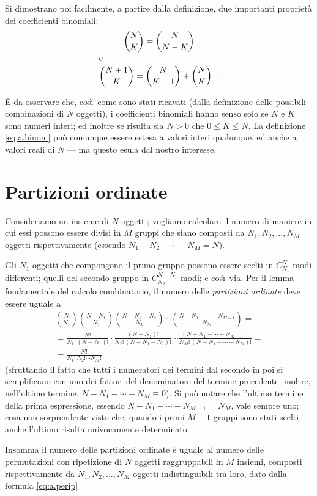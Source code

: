 %
Si dimostrano poi facilmente, a partire dalla definizione,
due importanti propriet\`a dei coefficienti binomiali:
\begin{gather*}
  \binom{N}{K} = \binom{N}{N-K} \\
  \intertext{e}
  \binom{N+1}{K} = \binom{N}{K-1} + \binom{N}{K} \;\; .
\end{gather*}

\`E da osservare che, cos\`\i\ come sono stati ricavati
(dalla definizione delle possibili combinazioni di $N$
oggetti), i coefficienti binomiali hanno senso solo se $N$ e
$K$ sono numeri interi; ed inoltre se risulta sia $N > 0$
che $0 \le K \le N$.  La definizione \eqref{eq:a.binom}
pu\`o comunque essere estesa a valori interi qualunque, ed
anche a valori reali di $N$ --- ma questo esula dal nostro
interesse.%
%

\section{Partizioni ordinate}%
%
\label{ch:a.parord}
Consideriamo un insieme di $N$ oggetti; vogliamo calcolare
il numero di maniere in cui essi possono essere divisi in
$M$ gruppi che siano composti da $N_1, N_2,\ldots,N_M$
oggetti rispettivamente (essendo $N_1 + N_2 + \cdots + N_M =
N$).

Gli $N_1$ oggetti che compongono il primo gruppo possono
essere scelti in $C^N_{N_1}$ modi differenti; quelli del
secondo gruppo in $C^{N-N_1}_{N_2}$ modi; e cos\`\i\ via.
Per il lemma fondamentale del calcolo combinatorio, il
numero delle \emph{partizioni ordinate} deve essere uguale a
\begin{multline*}
  \binom{N}{N_1} \binom{N-N_1}{N_2}
    \binom{N-N_1-N_2}{N_3} \cdots
    \binom{N-N_1-\cdots-N_{M-1}}{N_M} = \\[1.5ex]
  = \frac{N!}{N_1! \, (N-N_1)!} \cdot
    \frac{(N-N_1)!}{N_2! \, (N-N_1-N_2)!} \cdots
    \frac{(N-N_1-\cdots-N_{M-1})!}{N_M! \,
    (N-N_1-\cdots-N_M)!} = \\[1.5ex]
  = \frac{N!}{N_1! \, N_2! \cdots N_M!}
\end{multline*}
(sfruttando il fatto che tutti i numeratori dei termini dal
secondo in poi si semplificano con uno dei fattori del
denominatore del termine precedente; inoltre, nell'ultimo
termine, $N-N_1-\cdots-N_M \equiv 0$).  Si pu\`o notare che
l'ultimo termine della prima espressione, essendo
$N-N_1-\cdots-N_{M-1} = N_M$, vale sempre uno; cosa non
sorprendente visto che, quando i primi $M-1$ gruppi sono
stati scelti, anche l'ultimo risulta univocamente
determinato.

Insomma il numero delle partizioni ordinate \`e uguale al
numero delle permutazioni con ripetizione di $N$ oggetti
raggruppabili in $M$ insiemi, composti rispettivamente da
$N_1, N_2,\ldots,N_M$ oggetti indistinguibili tra loro, dato
dalla formula \eqref{eq:a.perip}%
%

\endinput
